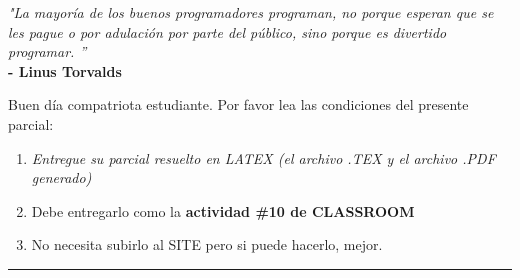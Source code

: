 \documentclass[letter,12pt,twoside]{book} 	%
\begin{document}
\begin{flushright}
{\it   "La mayoría de los buenos programadores programan, no porque esperan que se les pague o por adulación por parte del público, sino porque es divertido programar. 
”}\\ 
{\bf - Linus Torvalds   }
\end{flushright}


Buen día compatriota estudiante. Por favor lea las condiciones del presente parcial:

\begin{enumerate}
\item  {\it Entregue su parcial resuelto en LATEX (el archivo .TEX y el archivo .PDF generado)} 
\item Debe entregarlo como la  {\bf actividad \#10 de CLASSROOM}
\item No necesita subirlo al SITE pero si puede hacerlo, mejor.
\end{enumerate}
 
 

\noindent\rule{16.8cm}{0.4pt}
\end{document}
